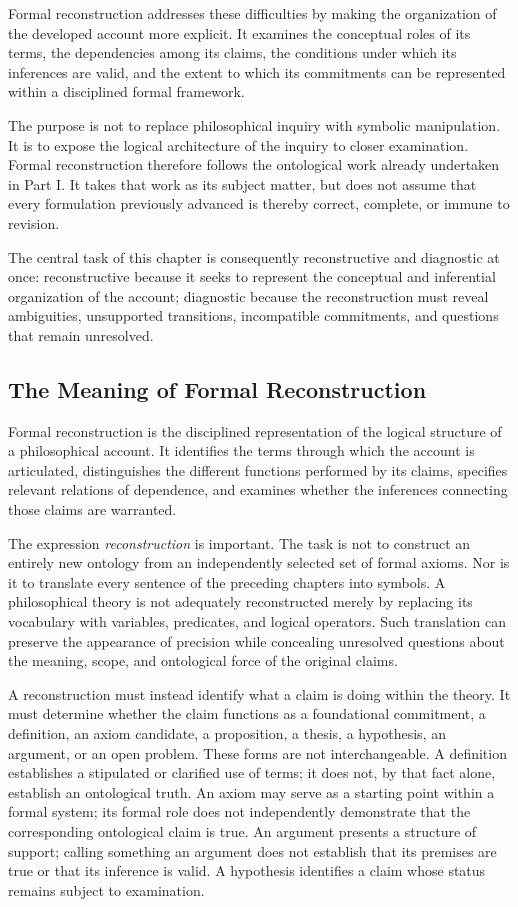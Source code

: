 Formal reconstruction addresses these difficulties by making the
organization of the developed account more explicit. It examines the
conceptual roles of its terms, the dependencies among its claims, the
conditions under which its inferences are valid, and the extent to which its
commitments can be represented within a disciplined formal framework.

The purpose is not to replace philosophical inquiry with symbolic
manipulation. It is to expose the logical architecture of the inquiry to
closer examination. Formal reconstruction therefore follows the ontological
work already undertaken in Part I. It takes that work as its subject matter,
but does not assume that every formulation previously advanced is thereby
correct, complete, or immune to revision.

The central task of this chapter is consequently reconstructive and
diagnostic at once: reconstructive because it seeks to represent the
conceptual and inferential organization of the account; diagnostic because
the reconstruction must reveal ambiguities, unsupported transitions,
incompatible commitments, and questions that remain unresolved.

\subsection{The Meaning of Formal Reconstruction}

Formal reconstruction is the disciplined representation of the logical
structure of a philosophical account. It identifies the terms through which
the account is articulated, distinguishes the different functions performed
by its claims, specifies relevant relations of dependence, and examines
whether the inferences connecting those claims are warranted.

The expression \emph{reconstruction} is important. The task is not to
construct an entirely new ontology from an independently selected set of
formal axioms. Nor is it to translate every sentence of the preceding
chapters into symbols. A philosophical theory is not adequately reconstructed
merely by replacing its vocabulary with variables, predicates, and logical
operators. Such translation can preserve the appearance of precision while
concealing unresolved questions about the meaning, scope, and ontological
force of the original claims.

A reconstruction must instead identify what a claim is doing within the
theory. It must determine whether the claim functions as a foundational
commitment, a definition, an axiom candidate, a proposition, a thesis, a
hypothesis, an argument, or an open problem. These forms are not
interchangeable. A definition establishes a stipulated or clarified use of
terms; it does not, by that fact alone, establish an ontological truth. An
axiom may serve as a starting point within a formal system; its formal role
does not independently demonstrate that the corresponding ontological
claim is true. An argument presents a structure of support; calling
something an argument does not establish that its premises are true or that
its inference is valid. A hypothesis identifies a claim whose status remains
subject to examination.

